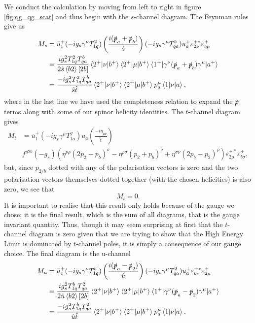 We conduct the calculation by moving from left to right in figure \ref{fig:qg_qg_scat} and thus begin with the $s$-channel diagram. The Feynman rules give us 
\begin{equation}
\begin{split}
M_s &= \bar{u}^+_1 (- i g_s \gamma^\nu T^2_{1q}) \left( \frac{i(\slashed{p}_a + \slashed{p}_b)}{\hat{s}}\right)(- ig_s \gamma^\mu T^b_{qa}) u_a^+ \varepsilon_{2 \nu}^{+*} \varepsilon_{b \mu}^+ \\
&= \frac{i g_s^2 T^2_{1q}T^b_{qa}}{2 \hat{s} \left<b 2 \right> [2b]} \mathinner{\langle2^+\vert\nu\vert b^+\rangle}_{} \mathinner{\langle2^+\vert\mu\vert b^+\rangle}_{} \mathinner{\langle1^+\vert\gamma^\nu (\slashed{p}_a + \slashed{p}_b) \gamma^\mu\vert a^+\rangle}_{} \\
&= \frac{-i g_s^2 T^2_{1q}T^b_{qa}}{\hat{s} \hat{t}} \mathinner{\langle2^+\vert\nu\vert b^+\rangle}_{} \mathinner{\langle2^+\vert\mu\vert b^+\rangle}_{} p_a^\mu \mathinner{\langle1\vert\nu\vert a\rangle}_{},
\end{split}
\end{equation}
where in the last line we have used the completeness relation to expand the $\slashed{p}$ terms along with some of our spinor helicity identities. The $t$-channel diagram gives
\begin{equation}
\begin{split}
M_t & = \bar{u}_1^+ (- i g_s \gamma^\mu T^g_{1a}) u_a \left(\frac{-i \eta_{\mu \nu}}{\hat{t}} \right) \\
& f^{g2b}(-g_s)(\eta^{\nu \rho}(2 p_2 - p_b)^\sigma - \eta^{\rho \sigma}(p_2 + p_b)^\nu + \eta^{\sigma \nu}(2 p_b - p_2)^\rho) \varepsilon_{2 \rho}^{+*} \varepsilon_{b \sigma}^+,
\end{split}
\end{equation}
but, since $p_{2/b}$ dotted with any of the polarisation vectors is zero and the two polarisation vectors themselves dotted together (with the chosen helicities) is also zero, we see that
\begin{equation}
M_t = 0.
\end{equation}
It is important to realise that this result only holds because of the gauge we chose; it is the final result, which is the sum of all diagrams, that is the gauge invariant quantity. Thus, though it may seem surprising at first that the $t$-channel diagram is zero given that we are trying to show that the High Energy Limit is dominated by $t$-channel poles, it is simply a consequence of our gauge choice. The final diagram is the u-channel
\begin{equation}
\begin{split}
M_u &= \bar{u}^+_1 (- i g_s \gamma^\nu T^b_{1q}) \left( \frac{i(\slashed{p}_a - \slashed{p}_2)}{\hat{u}}\right)(- ig_s \gamma^\mu T^2_{qa}) u_a^+ \varepsilon_{b \nu}^{+*} \varepsilon_{2 \mu}^+ \\
&= \frac{i g_s^2 T^b_{1q}T^2_{qa}}{2 \hat{u} \left<b 2 \right> [2b]} \mathinner{\langle2^+\vert\nu\vert b^+\rangle}_{} \mathinner{\langle2^+\vert\mu\vert b^+\rangle}_{} \mathinner{\langle1^+\vert\gamma^\nu (\slashed{p}_a - \slashed{p}_2) \gamma^\mu\vert a^+\rangle}_{} \\
&= \frac{-i g_s^2 T^b_{1q}T^2_{qa}}{\hat{u} \hat{t}} \mathinner{\langle2^+\vert\nu\vert b^+\rangle}_{} \mathinner{\langle2^+\vert\mu\vert b^+\rangle}_{} p_a^\mu \mathinner{\langle1\vert\nu\vert a\rangle}_{}.
\end{split}
\end{equation}
